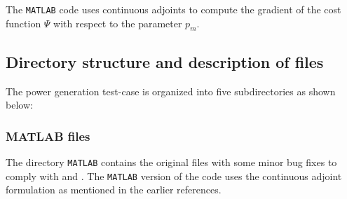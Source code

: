 \noindent The \texttt{MATLAB} code uses continuous adjoints to compute the gradient of the cost function $\Psi$ with respect to the parameter $p_m$.
\clearpage
\subsection{Directory structure and description of files}
The power generation test-case is organized into five subdirectories as shown below:\\
\subsubsection{MATLAB files}
The directory \texttt{MATLAB} contains the original files with some minor bug fixes to comply with \cite{Rao_2013} and \cite{Sandu_2012}. The \texttt{MATLAB} version of the code uses the continuous adjoint formulation as mentioned in the earlier references.

